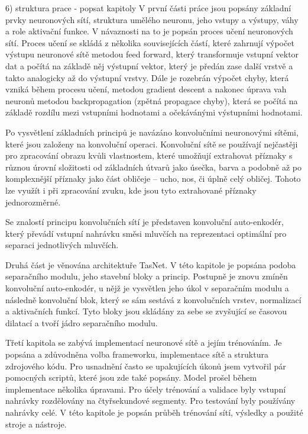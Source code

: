 6) struktura prace - popsat kapitoly
V první části práce jsou popsány základní prvky neuronových sítí, struktura umělého neuronu, jeho vstupy a výstupy, váhy a role aktivační funkce. V návaznosti na to je popsán proces učení neuronových sítí. Proces učení se skládá z několika souvisejících částí, které zahrnují výpočet výstupu neuronové sítě metodou feed forward, který transformuje vstupní vektor dat a počítá na základě něj výstupní vektor, který je předán zase další vrstvě a takto analogicky až do výstupní vrstvy. Dále je rozebrán výpočet chyby, která vzniká během procesu učení, metodou gradient descent a nakonec úprava vah neuronů metodou backpropagation (zpětná propagace chyby), která se počítá na základě rozdílu mezi vstupními hodnotami a očekávánými výstupními hodnotami.

Po vysvětlení základních principů je navázáno konvolučními neuronovými sítěmi, které jsou založeny na konvoluční operaci. Konvoluční sítě se používají nejčastěji pro zpracování obrazu kvůli vlastnostem, které umožňují extrahovat příznaky s různou úrovní složitosti od základních útvarů jako úsečka, barva a podobně až po komplexnější příznaky jako část obličeje -- ucho, nos, či úplně celý obličej. Tohoto lze využít i při zpracování zvuku, kde jsou tyto extrahované příznaky jednorozměrné.

Se znalostí principu konvolučních sítí je představen konvoluční auto-enkodér, který převádí vstupní nahrávku směsi mluvčích na reprezentaci optimální pro separaci jednotlivých mluvčích.

Druhá část je věnována architektuře TasNet. V této kapitole je popsána podoba separačního modulu, jeho stavební bloky a princip. Postupně je znovu zmíněn konvoluční auto-enkodér, u nějž je vysvětlen jeho úkol v separačním modulu a následně konvoluční blok, který se sám sestává z konvolučních vrstev, normalizací a aktivačních funkcí. Tyto bloky jsou skládány za sebe se zvyšující se časovou dilatací a tvoří jádro separačního modulu.

Třetí kapitola se zabývá implementací neuronové sítě a jejím trénováním. Je popsána a zdůvodněna volba frameworku, implementace sítě a struktura zdrojového kódu. Pro usnadnění často se upakujících úkonů jsem vytvořil pár pomocných scriptů, které jsou zde také popsány. 
Model prošel během implementace několika úpravami. Pro účely trénování a validace byly vstupní nahrávky rozdělovány na čtyřsekundové segmenty. Pro testování byly používány nahrávky celé. V této kapitole je popsán průběh trénování sítí, výsledky a použité stroje a nástroje.


